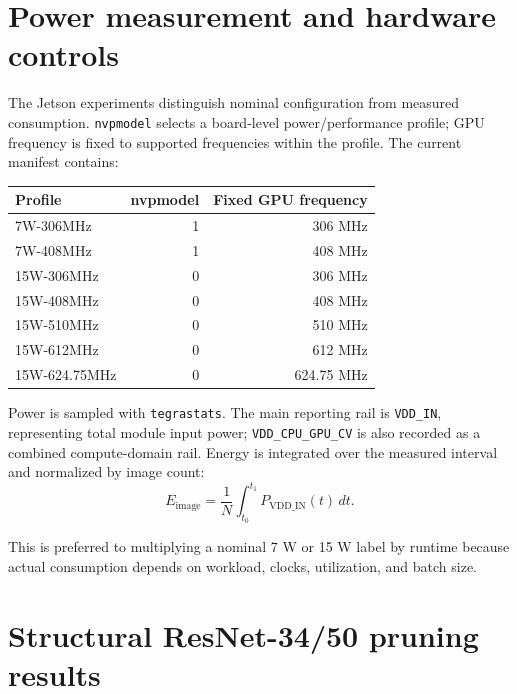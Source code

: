 \documentclass[11pt,a4paper]{article}
\newcommand{\code}[1]{\texttt{#1}}
\begin{document}
\section{Power measurement and hardware controls}
\label{app:power}

The Jetson experiments distinguish nominal configuration from measured consumption. \code{nvpmodel} selects a board-level power/performance profile; GPU frequency is fixed to supported frequencies within the profile. The current manifest contains:

\begin{table}[H]
\centering
\begin{tabular}{@{}lrr@{}}
\toprule
Profile & nvpmodel & Fixed GPU frequency \\
\midrule
7W-306MHz & 1 & 306 MHz \\
7W-408MHz & 1 & 408 MHz \\
15W-306MHz & 0 & 306 MHz \\
15W-408MHz & 0 & 408 MHz \\
15W-510MHz & 0 & 510 MHz \\
15W-612MHz & 0 & 612 MHz \\
15W-624.75MHz & 0 & 624.75 MHz \\
\bottomrule
\end{tabular}
\end{table}

Power is sampled with \code{tegrastats}. The main reporting rail is \code{VDD\_IN}, representing total module input power; \code{VDD\_CPU\_GPU\_CV} is also recorded as a combined compute-domain rail. Energy is integrated over the measured interval and normalized by image count:
\begin{equation}
 E_{\mathrm{image}} = \frac{1}{N}\int_{t_0}^{t_1}P_{\mathrm{VDD\_IN}}(t)\,dt.
\end{equation}

This is preferred to multiplying a nominal 7 W or 15 W label by runtime because actual consumption depends on workload, clocks, utilization, and batch size.

\section{Structural ResNet-34/50 pruning results}
\label{app:pruning}
\end{document}
